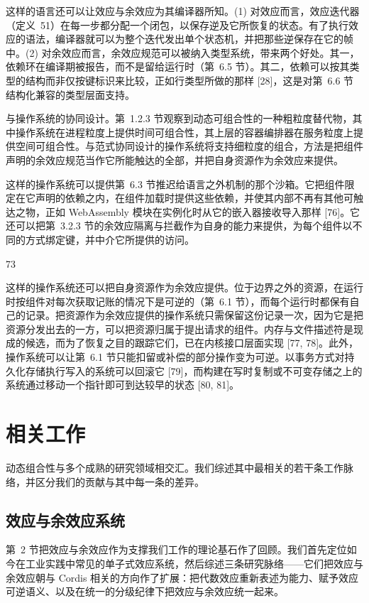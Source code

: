 \documentclass[
  10
]{article}
\begin{document}
这样的语言还可以让效应与余效应为其编译器所知。(1) 对效应而言，效应迭代器（定义~51）在每一步都分配一个闭包，以保存逆及它所恢复的状态。有了执行效应的语法，编译器就可以为整个迭代发出单个状态机，并把那些逆保存在它的帧中。(2) 对余效应而言，余效应规范可以被纳入类型系统，带来两个好处。其一，依赖环在编译期被报告，而不是留给运行时（第~6.5 节）。其二，依赖可以按其类型的结构而非仅按键标识来比较，正如行类型所做的那样 {[}28{]}，这是对第~6.6 节结构化兼容的类型层面支持。

与操作系统的协同设计。第~1.2.3 节观察到动态可组合性的一种粗粒度替代物，其中操作系统在进程粒度上提供时间可组合性，其上层的容器编排器在服务粒度上提供空间可组合性。与范式协同设计的操作系统将支持细粒度的组合，方法是把组件声明的余效应规范当作它所能触达的全部，并把自身资源作为余效应来提供。

这样的操作系统可以提供第~6.3 节推迟给语言之外机制的那个沙箱。它把组件限定在它声明的依赖之内，在组件加载时提供这些依赖，并使其内部不再有其他可触达之物，正如 WebAssembly 模块在实例化时从它的嵌入器接收导入那样 {[}76{]}。它还可以把第~3.2.3 节的余效应隔离与拦截作为自身的能力来提供，为每个组件以不同的方式绑定键，并中介它所提供的访问。

73

这样的操作系统还可以把自身资源作为余效应提供。位于边界之外的资源，在运行时按组件对每次获取记账的情况下是可逆的（第~6.1 节），而每个运行时都保有自己的记录。把资源作为余效应提供的操作系统只需保留这份记录一次，因为它是把资源分发出去的一方，可以把资源归属于提出请求的组件。内存与文件描述符是现成的候选，而为了恢复之目的跟踪它们，已在内核接口层面实现 {[}77, 78{]}。此外，操作系统可以让第~6.1 节只能扣留或补偿的部分操作变为可逆。以事务方式对持久化存储执行写入的系统可以回滚它 {[}79{]}，而构建在写时复制或不可变存储之上的系统通过移动一个指针即可到达较早的状态 {[}80, 81{]}。
\section{相关工作} \label{related-work}

动态组合性与多个成熟的研究领域相交汇。我们综述其中最相关的若干条工作脉络，并区分我们的贡献与其中每一条的差异。

\subsection{效应与余效应系统} \label{efect-and-coefect-systems}

第~2 节把效应与余效应作为支撑我们工作的理论基石作了回顾。我们首先定位如今在工业实践中常见的单子式效应系统，然后综述三条研究脉络——它们把效应与余效应朝与 Cordis 相关的方向作了扩展：把代数效应重新表述为能力、赋予效应可逆语义、以及在统一的分级纪律下把效应与余效应统一起来。
\end{document}
